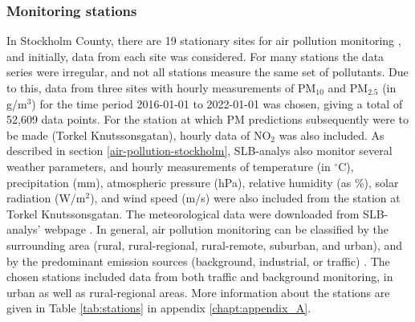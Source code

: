 \subsubsection{Monitoring stations}
In Stockholm County, there are 19 stationary sites for air pollution monitoring \cite{slb-matningar}, and initially, data from each site was considered. For many stations the data series were irregular, and not all stations measure the same set of pollutants. Due to this, data from three sites with hourly measurements of PM$_{10}$ and PM$_{2.5}$ (in \textmugreek g/m$^3$) for the time period 2016-01-01 to 2022-01-01 was chosen, giving a total of 52,609 data points. For the station at which PM predictions subsequently were to be made (Torkel Knutssonsgatan), hourly data of NO$_2$ was also included. As described in section \ref{air-pollution-stockholm}, SLB-analys also monitor several weather parameters, and hourly measurements of temperature (in $^\circ$C), precipitation (mm), atmospheric pressure (hPa), relative humidity (as \%), solar radiation (W/m$^2$), and wind speed (m/s) were also included from the station at Torkel Knutssonsgatan. The meteorological data were downloaded from SLB-analys' webpage \cite{slb-analys-meteorologi}. In general, air pollution monitoring can be classified by the surrounding area (rural, rural-regional, rural-remote, suburban, and urban), and by the predominant emission sources (background, industrial, or traffic) \cite{smhi-luftmatningar}. The chosen stations included data from both traffic and background monitoring, in urban as well as rural-regional areas. More information about the stations are given in Table \ref{tab:stations} in appendix \ref{chapt:appendix_A}. 

